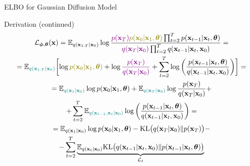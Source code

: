 \documentclass{beamer}
\begin{document}
\begin{frame}{ELBO for Gaussian Diffusion Model}
    \begin{block}{Derivation (continued)}
        \vspace{-0.7cm}
        {\small
        \begin{multline*}
            \cL_{\bphi, \btheta}(\bx) = \bbE_{q(\bx_{1:T} | \bx_0)} \log \frac{{\color{violet}p(\bx_T)} {\color{olive}p(\bx_0 | \bx_1, \btheta)} \prod_{t=2}^T p(\bx_{t-1} | \bx_t, \btheta) }{{\color{violet}q(\bx_T | \bx_0)}\prod_{t=2}^T q(\bx_{t-1}|\bx_t, \bx_0)}  = \\
            = \bbE_{{\color{teal}q(\bx_{1:T} | \bx_0)}} \biggl[ \log {\color{olive}p(\bx_0 | \bx_1, \btheta)} + \log {\color{violet}\frac{p(\bx_T)}{q(\bx_T | \bx_0)}} + \sum_{t=2}^T \log \left( \frac{p(\bx_{t-1} | \bx_t, \btheta)}{q(\bx_{t-1}|\bx_{t}, \bx_0)}\right) \biggr] = \\
             = \bbE_{{\color{teal}q(\bx_1 | \bx_0)}} \log p(\bx_0 | \bx_1, \btheta) + \bbE_{{\color{teal}q(\bx_T | \bx_0)}} \log \frac{p(\bx_T)}{q(\bx_T | \bx_0)} + \\
              + \sum_{t=2}^T \bbE_{{\color{teal}q(\bx_{t-1}, \bx_t | \bx_0)}} \log \left( \frac{p(\bx_{t-1} | \bx_t, \btheta)}{q(\bx_{t-1}|\bx_{t}, \bx_0)}\right) = \\
              = \bbE_{q(\bx_1 | \bx_0)} \log p(\bx_0 | \bx_1, \btheta) - \KL\bigl(q(\bx_T | \bx_0) \| p(\bx_T)\bigr) - \\
                        - \sum_{t=2}^T \underbrace{ \bbE_{q(\bx_t | \bx_0)} \KL \bigl(q(\bx_{t-1} | \bx_t, \bx_0) \| p(\bx_{t - 1} | \bx_t, \btheta )\bigr)}_{\cL_t}
        \end{multline*}
        }
        \vspace{-0.3cm}
    \end{block}
\end{frame}
\end{document}
